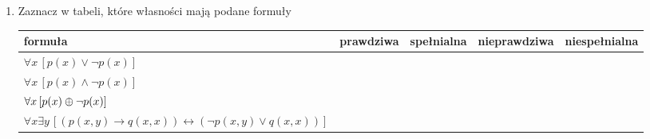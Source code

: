 \documentclass{mwart}
\newcommand{\xor}{\ensuremath\oplus}
\renewcommand{\iff}{\ensuremath\leftrightarrow}
\renewcommand{\iff}{\leftrightarrow}
\begin{document}
\begin{enumerate}
		\begin{multicols}{3}
			\begin{enumerate}
				\item $\forall x\, (p(x)\to \exists y\, q(y))$
				\item $\forall x\, (p(x)\to \exists y\, q(f(y)))$
				\item $\forall x\, (p(x)\to q(g(b, y)))$
				\item $p(x)\to \exists y\, q(y)$
				\item $p(a)\to \exists y\, q(y)$
				\item $\forall x\, (p(x)\to q(x))$
				\item $\forall x\, (p(x)\to \exists x\, q(x))$
			\end{enumerate}
		\end{multicols}
	\item Zaznacz w tabeli, które własności mają podane formuły\\
		\begin{tabular}{|l|l|l|l|l|}
		\hline
		formuła & prawdziwa & spełnialna & nieprawdziwa & niespełnialna \\
		\hline
		$\forall x\, [p(x) \lor \lnot p(x)]$ & & & &  \\
		\hline
		$\forall x\, [p(x) \land \lnot p(x)]$ & & & & \\
		\hline
		$\forall x\, [p(x) \xor \lnot p(x)]$ & & & & \\
		\hline
		$\forall x\exists y\, [(p(x,y) \to q(x,x))\iff(\lnot p(x,y) \lor q(x,x))]$ & & & & \\
		\hline		
		\end{tabular}
\end{enumerate}
\end{document}
